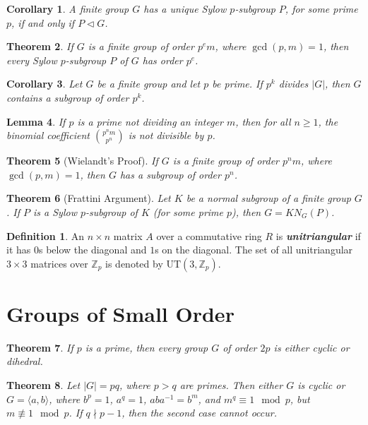 \documentclass[12pt]{report}
\newtheorem{theorem}{Theorem}[chapter]
\newtheorem{corollary}[theorem]{Corollary}
\newtheorem{lemma}[theorem]{Lemma}
\theoremstyle{definition}
\newtheorem*{definition}{Definition}
\newcommand{\term}[1]{\textbf{\textit{#1}}}
\newcommand{\gen}[1]{{\langle}#1{\rangle}}
\begin{document}
\begin{corollary}
	A finite group $G$ has a unique Sylow $p$-subgroup $P$, for some prime $p$, if and only if $P\vartriangleleft G$.
\end{corollary}

\begin{theorem}
	If $G$ is a finite group of order $p{^e}m$, where $\gcd(p,m)=1$, then every Sylow $p$-subgroup $P$ of $G$ has order $p^e$.
\end{theorem}

\begin{corollary}
	Let $G$ be a finite group and let $p$ be prime. If $p^k$ divides $|G|$, then $G$ contains a subgroup of order $p^k$.
\end{corollary}

\begin{lemma}
	If $p$ is a prime not dividing an integer $m$, then for all $n\geq 1$, the binomial coefficient $\binom{p{^n}m}{p^n}$ is not divisible by $p$.
\end{lemma}

\begin{theorem}[Wielandt's Proof]
	If $G$ is a finite group of order $p{^n}m$, where $\gcd(p,m)=1$, then $G$ has a subgroup of order $p^n$.
\end{theorem}

\begin{theorem}[Frattini Argument]
	Let $K$ be a normal subgroup of a finite group $G$. If $P$ is a Sylow $p$-subgroup of $K$ (for some prime $p$), then $G=KN_G(P)$.
\end{theorem}

\begin{definition}
	An $n\times n$ matrix $A$ over a commutative ring $R$ is \term{unitriangular} if it has $0$s below the diagonal and $1$s on the diagonal.
	The set of all unitriangular $3\times 3$ matrices over $\mathbb{Z}_p$ is denoted by $\mathrm{UT}(3,\mathbb{Z}_p)$.
\end{definition}

\section{Groups of Small Order}
\begin{theorem}
	If $p$ is a prime, then every group $G$ of order $2p$ is either cyclic or dihedral.
\end{theorem}

\begin{theorem}
	Let $|G|=pq$, where $p>q$ are primes. Then either $G$ is cyclic or $G=\gen{a,b}$, where $b^p=1$, $a^q=1$, $aba^{-1}=b^m$, and $m^q\equiv 1\mod p$, but $m\not\equiv 1\mod p$.
	If $q\nmid p-1$, then the second case cannot occur.
\end{theorem}
\end{document}
